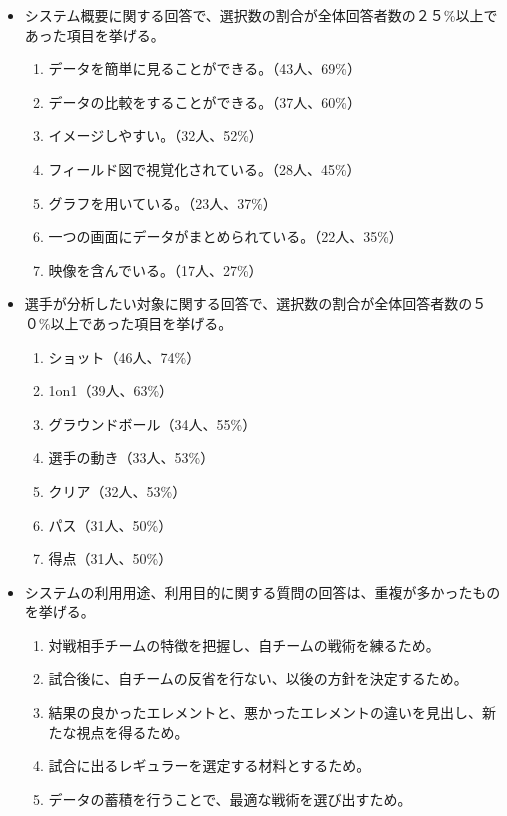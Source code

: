\documentclass[sotsuron]{kuee}
\begin{document}
\begin{itemize}
\item システム概要に関する回答で、選択数の割合が全体回答者数の２５\%以上であった項目を挙げる。
	\begin{enumerate}
	\item データを簡単に見ることができる。（43人、69\%）
	\item データの比較をすることができる。（37人、60\%）
	\item イメージしやすい。（32人、52\%）
	\item フィールド図で視覚化されている。（28人、45\%）
	\item グラフを用いている。（23人、37\%）
	\item 一つの画面にデータがまとめられている。（22人、35\%）
	\item 映像を含んでいる。（17人、27\%）
	\end{enumerate}
\item 選手が分析したい対象に関する回答で、選択数の割合が全体回答者数の５０\%以上であった項目を挙げる。
	\begin{enumerate}
	\item ショット（46人、74\%）
	\item 1on1（39人、63\%）
	\item グラウンドボール（34人、55\%）
	\item 選手の動き（33人、53\%）
	\item クリア（32人、53\%）
	\item パス（31人、50\%）
	\item 得点（31人、50\%）
	\end{enumerate}
\item システムの利用用途、利用目的に関する質問の回答は、重複が多かったものを挙げる。
	\begin{enumerate}
	\item 対戦相手チームの特徴を把握し、自チームの戦術を練るため。
	\item 試合後に、自チームの反省を行ない、以後の方針を決定するため。
	\item 結果の良かったエレメントと、悪かったエレメントの違いを見出し、新たな視点を得るため。
	\item 試合に出るレギュラーを選定する材料とするため。
	\item データの蓄積を行うことで、最適な戦術を選び出すため。
	\end{enumerate}
\end{itemize}
\end{document}
